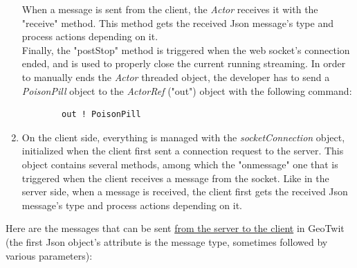 \documentclass[a4paper,11pt]{report}
\begin{document}
\begin{enumerate}
	When a message is sent from the client, the \emph{Actor} receives it with the "receive" method. This method gets the received Json message's type and process actions depending on it.\\
	Finally, the "postStop" method is triggered when the web socket's connection ended, and is used to properly close the current running streaming. In order to manually ends the \emph{Actor} threaded object, the developer has to send a \emph{PoisonPill} object to the \emph{ActorRef} ("out") object with the following command:
	\begin{lstlisting}
		out ! PoisonPill
	\end{lstlisting}
	
	\item On the client side, everything is managed with the \emph{socketConnection} object, initialized when the client first sent a connection request to the server. This object contains several methods, among which the "onmessage" one that is triggered when the client receives a message from the socket. Like in the server side, when a message is received, the client first gets the received Json message's type and process actions depending on it.
\end{enumerate}
\bigskip
Here are the messages that can be sent \underline{from the server to the client} in GeoTwit (the first Json object's attribute is the message type, sometimes followed by various parameters):
\end{document}

